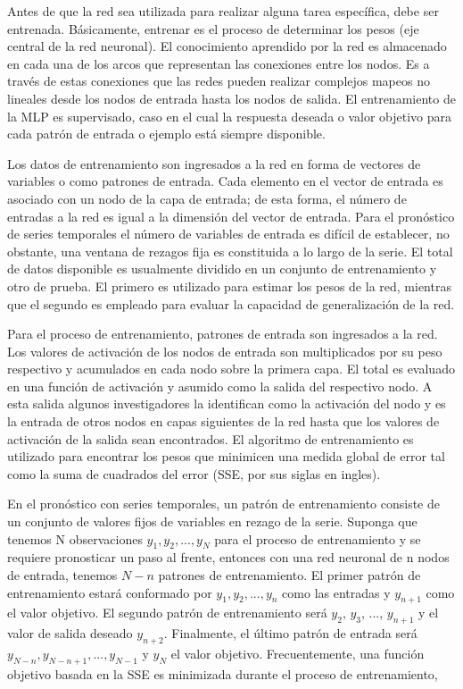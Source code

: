 \hspace*{0.4 cm} Antes de que la red sea utilizada para realizar alguna tarea espec\'ifica, debe ser entrenada. B\'asicamente, entrenar es el proceso de determinar los pesos (eje central de la red neuronal). El conocimiento aprendido por la red es almacenado en cada una de los arcos que representan las conexiones entre los nodos. Es a trav\'es de estas conexiones que las redes pueden realizar complejos mapeos no lineales desde los nodos de entrada hasta los nodos de salida. El entrenamiento de la MLP es supervisado, caso en el cual la respuesta deseada o valor objetivo para cada patr\'on de entrada o ejemplo est\'a siempre disponible.

\hspace*{0.4 cm} Los datos de entrenamiento son ingresados a la red en forma de vectores de variables o como patrones de entrada. Cada elemento en el vector de entrada es asociado con un nodo de la capa de entrada; de esta forma, el n\'umero de entradas a la red es igual a la dimensi\'on del vector de entrada. Para el pron\'ostico de series temporales el n\'umero de variables de entrada es dif\'icil de establecer, no obstante, una ventana de rezagos fija es constituida a lo largo de la serie. El total de datos disponible es usualmente dividido en un conjunto de entrenamiento y otro de prueba. El primero es utilizado para estimar los pesos de la red, mientras que el segundo es empleado para evaluar la capacidad de generalizaci\'on de la red.


\hspace*{0.4 cm} Para el proceso de entrenamiento, patrones de entrada son ingresados a la red. Los valores de activaci\'on de los nodos de entrada son multiplicados por su peso respectivo y acumulados en cada nodo sobre la primera capa. El total es evaluado en una funci\'on de activaci\'on y asumido como la salida del respectivo nodo. A esta salida algunos investigadores la identifican como la activaci\'on del nodo y es la entrada de otros nodos en capas siguientes de la red hasta que los valores de activaci\'on de la salida sean encontrados. El algoritmo de entrenamiento es utilizado para encontrar los pesos que minimicen una medida global de error tal como la suma de cuadrados del error (SSE, por sus siglas en ingles).


\hspace*{0.4 cm} En el pron\'ostico con series temporales, un patr\'on de entrenamiento consiste de un conjunto de valores fijos de variables en rezago de la serie. Suponga que tenemos N observaciones $y_{1}, y_{2}, ..., y_{N}$ para el proceso de entrenamiento y se requiere pronosticar un paso al frente, entonces con una red neuronal de n nodos de entrada, tenemos $N-n$ patrones de entrenamiento. El primer patr\'on de entrenamiento estar\'a conformado por $y_{1}, y_{2}, ..., y_{n}$ como las entradas y $y_{n+1}$ como el valor objetivo. El segundo patr\'on de entrenamiento ser\'a $y_{2}$, $y_{3}$, ..., $y_{n+1}$ y el valor de salida deseado $y_{n+2}$. Finalmente, el \'ultimo patr\'on de entrada ser\'a $y_{N-n}, y_{N-n+1}, ..., y_{N-1}$ y $y_{N}$ el valor objetivo. Frecuentemente, una funci\'on objetivo basada en la SSE es minimizada durante el proceso de entrenamiento,

